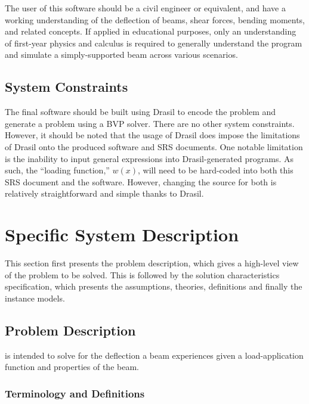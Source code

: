 \documentclass[12pt]{article}
\begin{document}
The user of this software should be a civil engineer or equivalent, and have a
working understanding of the deflection of beams, shear forces, bending moments,
and related concepts. If applied in educational purposes, only an understanding
of first-year physics and calculus is required to generally understand the
program and simulate a simply-supported beam across various scenarios.

\subsection{System Constraints}

The final software should be built using Drasil to encode the problem and
generate a problem using a BVP solver. There are no other system constraints.
However, it should be noted that the usage of Drasil does impose the limitations
of Drasil onto the produced software and SRS documents. One notable limitation
is the inability to input general expressions into Drasil-generated programs. As
such, the ``loading function,'' \(w(x)\), will need to be hard-coded into both
this SRS document and the software. However, changing the source for both is
relatively straightforward and simple thanks to Drasil.

\newpage


\section{Specific System Description}
\label{sec_ssd}

This section first presents the problem description, which gives a high-level
view of the problem to be solved.  This is followed by the solution
characteristics specification, which presents the assumptions, theories,
definitions and finally the instance models.

\subsection{Problem Description}
\label{Sec_pd}

\progname{} is intended to solve for the deflection a beam experiences given a
load-application function and properties of the beam.

\subsubsection{Terminology and  Definitions}
\end{document}
